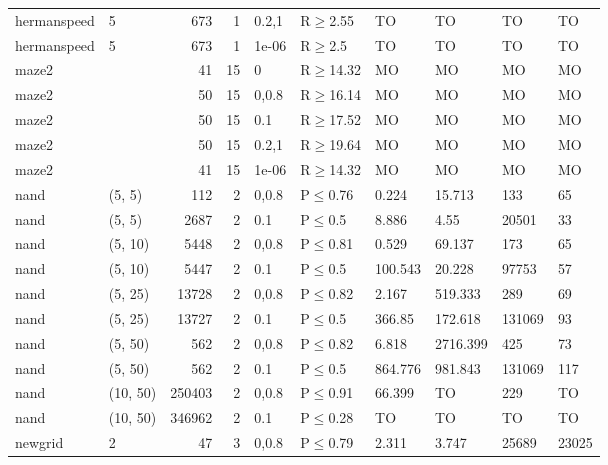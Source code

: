 \begin{longtable}{llrrllllll}
 hermanspeed   & 5        &    	673 &   1 & 0.2,1 & R$\geq$2.55  & TO       & TO       & TO      & TO     \\
 hermanspeed   & 5        &    	673 &   1 & 1e-06 & R$\geq$2.5   & TO       & TO       & TO      & TO     \\
 maze2         &          &     	41 &  15 & 0     & R$\geq$14.32 & MO       & MO       & MO      & MO     \\
 maze2         &          &     	50 &  15 & 0,0.8 & R$\geq$16.14 & MO       & MO       & MO      & MO     \\
 maze2         &          &     	50 &  15 & 0.1   & R$\geq$17.52 & MO       & MO       & MO      & MO     \\
 maze2         &          &     	50 &  15 & 0.2,1 & R$\geq$19.64 & MO       & MO       & MO      & MO     \\
 maze2         &          &     	41 &  15 & 1e-06 & R$\geq$14.32 & MO       & MO       & MO      & MO     \\
 nand          & (5, 5)   &    	112 &   2 & 0,0.8 & P$\leq$0.76  & 0.224    & 15.713   & 133     & 65     \\
 nand          & (5, 5)   &   	2687 &   2 & 0.1   & P$\leq$0.5   & 8.886    & 4.55     & 20501   & 33     \\
 nand          & (5, 10)  &   	5448 &   2 & 0,0.8 & P$\leq$0.81  & 0.529    & 69.137   & 173     & 65     \\
 nand          & (5, 10)  &   	5447 &   2 & 0.1   & P$\leq$0.5   & 100.543  & 20.228   & 97753   & 57     \\
 nand          & (5, 25)  &  	13728 &   2 & 0,0.8 & P$\leq$0.82  & 2.167    & 519.333  & 289     & 69     \\
 nand          & (5, 25)  &  	13727 &   2 & 0.1   & P$\leq$0.5   & 366.85   & 172.618  & 131069  & 93     \\
 nand          & (5, 50)  &    	562 &   2 & 0,0.8 & P$\leq$0.82  & 6.818    & 2716.399 & 425     & 73     \\
 nand          & (5, 50)  &    	562 &   2 & 0.1   & P$\leq$0.5   & 864.776  & 981.843  & 131069  & 117    \\
 nand          & (10, 50) & 	250403 &   2 & 0,0.8 & P$\leq$0.91  & 66.399   & TO       & 229     & TO     \\
 nand          & (10, 50) & 	346962 &   2 & 0.1   & P$\leq$0.28  & TO       & TO       & TO      & TO     \\
 newgrid       & 2        &     	47 &   3 & 0,0.8 & P$\leq$0.79  & 2.311    & 3.747    & 25689   & 23025  \\

\end{longtable}
